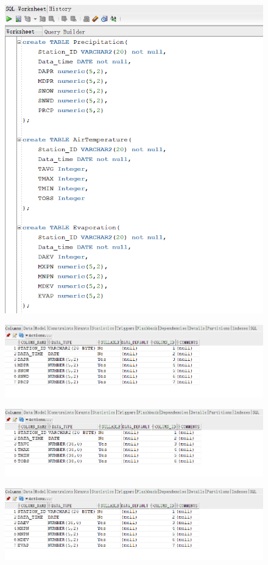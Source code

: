 \documentclass[]{article}
\begin{document}
	\begin{figure}[H]
		\centering
		\includegraphics[width=0.7\linewidth, height=0.33\textheight]{../d3-p/part3}
		\caption{}
		\label{fig:part3}
	\end{figure}
	
	\begin{figure}[H]
		\centering
		\includegraphics[width=0.8\linewidth]{../d3-p/part3-1}
		\caption{}
		\label{fig:part3-1}
	\end{figure}
	
	\begin{figure}[H]
		\centering
		\includegraphics[width=0.8\linewidth]{../d3-p/part3-2}
		\caption{}
		\label{fig:part3-2}
	\end{figure}

	\begin{figure}[H]
		\centering
		\includegraphics[width=0.8\linewidth]{../d3-p/part3-3}
		\caption{}
		\label{fig:part3-3}
	\end{figure}
	
\end{document}
